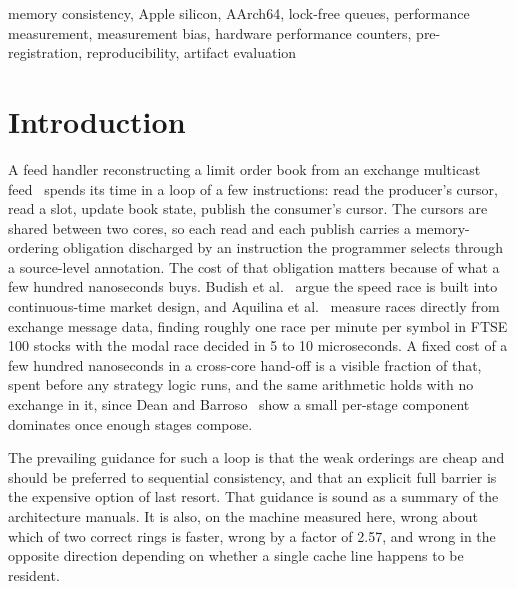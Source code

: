 \documentclass[conference]{IEEEtran}
\begin{document}
\begin{IEEEkeywords}
memory consistency, Apple silicon, AArch64, lock-free queues, performance
measurement, measurement bias, hardware performance counters,
pre-registration, reproducibility, artifact evaluation
\end{IEEEkeywords}

\section{Introduction}

A feed handler reconstructing a limit order book from an exchange multicast
feed~\cite{maciejewski2026cme} spends its time in a loop of a few
instructions: read the producer's cursor, read a slot, update book state,
publish the consumer's cursor. The cursors are shared between two cores, so
each read and each publish carries a memory-ordering obligation discharged by
an instruction the programmer selects through a source-level annotation. The
cost of that obligation matters because of what a few hundred nanoseconds buys.
Budish et al.~\cite{budish2015hft} argue the speed race is built into
continuous-time market design, and Aquilina et
al.~\cite{aquilina2022quantifying} measure races directly from exchange message
data, finding roughly one race per minute per symbol in FTSE 100 stocks with
the modal race decided in 5 to 10 microseconds. A fixed cost of a few hundred
nanoseconds in a cross-core hand-off is a visible fraction of that, spent
before any strategy logic runs, and the same arithmetic holds with no exchange
in it, since Dean and Barroso~\cite{dean2013tail} show a small per-stage
component dominates once enough stages compose.

The prevailing guidance for such a loop is that the weak orderings are cheap
and should be preferred to sequential consistency, and that an explicit full
barrier is the expensive option of last resort. That guidance is sound as a
summary of the architecture manuals. It is also, on the machine measured here,
wrong about which of two correct rings is faster, wrong by a factor of 2.57,
and wrong in the opposite direction depending on whether a single cache line
happens to be resident.
\end{document}
